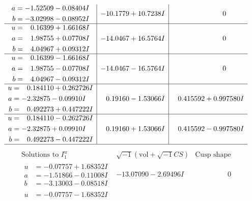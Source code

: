 \documentclass[1p]{elsarticle_modified}
\theoremstyle{definition}
\newcommand{\I}{\sqrt{-1}}
\begin{document}
$$\begin{array}{c|c|c}
\begin{aligned}
a &= -1.52509 - 0.08404 I \\
b &= -3.02998 - 0.08952 I\end{aligned}
 & -10.1779 + 10.7238 I & \phantom{-0.000000 } 0 \\ \hline\begin{aligned}
u &= \phantom{-}0.16399 + 1.66168 I \\
a &= \phantom{-}1.98755 + 0.07708 I \\
b &= \phantom{-}4.04967 + 0.09312 I\end{aligned}
 & -14.0467 + 16.5764 I & \phantom{-0.000000 } 0 \\ \hline\begin{aligned}
u &= \phantom{-}0.16399 - 1.66168 I \\
a &= \phantom{-}1.98755 - 0.07708 I \\
b &= \phantom{-}4.04967 - 0.09312 I\end{aligned}
 & -14.0467 - 16.5764 I & \phantom{-0.000000 } 0 \\ \hline\begin{aligned}
u &= \phantom{-}0.184110 + 0.262726 I \\
a &= -2.32875 - 0.09910 I \\
b &= \phantom{-}0.492273 + 0.447222 I\end{aligned}
 & \phantom{-}0.19160 - 1.53066 I & \phantom{-}0.415592 + 0.997580 I \\ \hline\begin{aligned}
u &= \phantom{-}0.184110 - 0.262726 I \\
a &= -2.32875 + 0.09910 I \\
b &= \phantom{-}0.492273 - 0.447222 I\end{aligned}
 & \phantom{-}0.19160 + 1.53066 I & \phantom{-}0.415592 - 0.997580 I\\
 \hline 
 \end{array}$$\newpage$$\begin{array}{c|c|c}  
\text{Solutions to }I^u_{1}& \I (\text{vol} + \sqrt{-1}CS) & \text{Cusp shape}\\
 \hline 
\begin{aligned}
u &= -0.07757 + 1.68352 I \\
a &= -1.51866 - 0.11008 I \\
b &= -3.13003 - 0.08518 I\end{aligned}
 & -13.07090 - 2.69496 I & \phantom{-0.000000 } 0 \\ \hline\begin{aligned}
u &= -0.07757 - 1.68352 I \\

\end{aligned}
\end{array}$$
\end{document}
